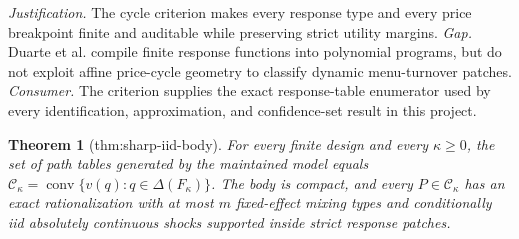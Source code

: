 \documentclass{article}
\newtheorem{theorem}{Theorem}
\begin{document}
\par\smallskip\noindent \textit{Justification.} The cycle criterion makes every response type and every price breakpoint finite and auditable while preserving strict utility margins. \textit{Gap.} Duarte et al. compile finite response functions into polynomial programs, but do not exploit affine price-cycle geometry to classify dynamic menu-turnover patches. \textit{Consumer.} The criterion supplies the exact response-table enumerator used by every identification, approximation, and confidence-set result in this project.

\begin{theorem}[thm:sharp-iid-body]\label{thm:sharp-iid-body}
For every finite design and every \(\kappa\ge0\), the set of path tables generated by the maintained model equals \(\mathcal C_\kappa=\operatorname{conv}\{v(q):q\in\Delta(F_\kappa)\}\). The body is compact, and every \(P\in\mathcal C_\kappa\) has an exact rationalization with at most \(m\) fixed-effect mixing types and conditionally iid absolutely continuous shocks supported inside strict response patches.
\end{theorem}
\end{document}

